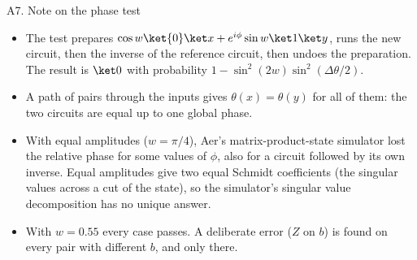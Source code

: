 \documentclass[aspectratio=169,10pt]{beamer}
\begin{document}
\begin{frame}{A7. Note on the phase test}
\small
\begin{itemize}
\item The test prepares $\cos w\ket{0}\ket x+e^{i\phi}\sin w\ket1\ket y$, runs the new circuit, then the inverse of the reference circuit, then undoes the preparation. The result is $\ket0$ with probability $1-\sin^2(2w)\sin^2(\Delta\theta/2)$.
\item A path of pairs through the inputs gives $\theta(x)=\theta(y)$ for all of them: the two circuits are equal up to one global phase.
\item With equal amplitudes ($w=\pi/4$), Aer's matrix-product-state simulator lost the relative phase for some values of $\phi$, also for a circuit followed by its own inverse. Equal amplitudes give two equal Schmidt coefficients (the singular values across a cut of the state), so the simulator's singular value decomposition has no unique answer.
\item With $w=0.55$ every case passes. A deliberate error ($Z$ on $b$) is found on every pair with different $b$, and only there.
\end{itemize}
\end{frame}
\end{document}
